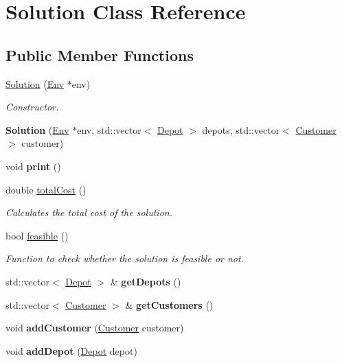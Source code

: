 \hypertarget{class_solution}{}\section{Solution Class Reference}
\label{class_solution}
\subsection*{Public Member Functions}
\begin{DoxyCompactItemize}
\item 
\hyperlink{class_solution_a3bdbdf455adecf7ab0f71bbce1efad66}{Solution} (\hyperlink{class_env}{Env} $\ast$env)
\begin{DoxyCompactList}\small\item\em Constructor. \end{DoxyCompactList}\item 
\mbox{\label{class_solution_ae5ae7771a56ee48728a905cd264730ac}} 
{\bfseries Solution} (\hyperlink{class_env}{Env} $\ast$env, std\+::vector$<$ \hyperlink{class_depot}{Depot} $>$ depots, std\+::vector$<$ \hyperlink{class_customer}{Customer} $>$ customer)
\item 
\mbox{\label{class_solution_a22519dee8cecd124e2e112a3a9bc505c}} 
void {\bfseries print} ()
\item 
double \hyperlink{class_solution_a227aaabdf34fbd2e01283728a5a344fe}{total\+Cost} ()
\begin{DoxyCompactList}\small\item\em Calculates the total cost of the solution. \end{DoxyCompactList}\item 
bool \hyperlink{class_solution_a13e4ebdccdbc8c572a82fb21254022d0}{feasible} ()
\begin{DoxyCompactList}\small\item\em Function to check whether the solution is feasible or not. \end{DoxyCompactList}\item 
\mbox{\label{class_solution_ab950712d080e8fcfda4d7f5b7126f1e6}} 
std\+::vector$<$ \hyperlink{class_depot}{Depot} $>$ \& {\bfseries get\+Depots} ()
\item 
\mbox{\label{class_solution_a535607b6b1cfd652f783c18f742be458}} 
std\+::vector$<$ \hyperlink{class_customer}{Customer} $>$ \& {\bfseries get\+Customers} ()
\item 
\mbox{\label{class_solution_a360f5711f6da7daba2d4eff39bfb00fc}} 
void {\bfseries add\+Customer} (\hyperlink{class_customer}{Customer} customer)
\item 
\mbox{\label{class_solution_af9d6aadb375d6e9ddadc8fcf31a53cf6}} 
void {\bfseries add\+Depot} (\hyperlink{class_depot}{Depot} depot)
\end{DoxyCompactItemize}
